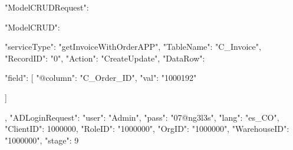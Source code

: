 {
    "ModelCRUDRequest": {
        "ModelCRUD": {
            "serviceType": "getInvoiceWithOrderAPP",
            "TableName": "C_Invoice",
            "RecordID": "0",
            "Action": "CreateUpdate",
            "DataRow": {
                "field": [
                    {
                        "@column": "C_Order_ID",
                        "val": "1000192"
                    }
                
                ]
            }
        },
        "ADLoginRequest": {
            "user": "Admin",
            "pass": "07@ng3l3s",
            "lang": "es_CO",
            "ClientID": 1000000,
            "RoleID": "1000000",
            "OrgID": "1000000",
            "WarehouseID": "1000000",
            "stage": 9
        }
    }
}






